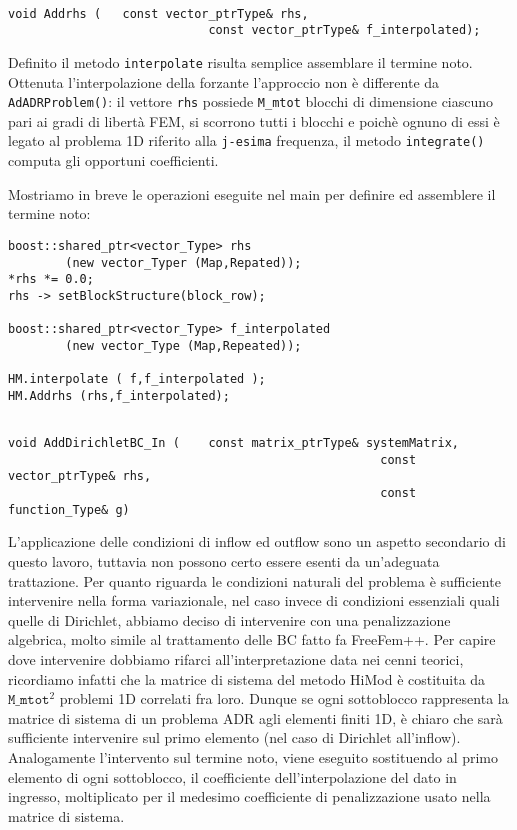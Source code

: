 \begin{lstlisting}[style=general, frame = top]

void Addrhs	(	const vector_ptrType& rhs,
							const vector_ptrType& f_interpolated);
\end{lstlisting}
Definito il metodo \texttt{interpolate} risulta semplice assemblare il termine noto. Ottenuta l'interpolazione della forzante l'approccio non \`e differente da \texttt{AdADRProblem()}: il vettore \texttt{rhs} possiede \texttt{M\_mtot} blocchi di dimensione ciascuno pari ai gradi di libert\`a FEM, si scorrono tutti i blocchi e poich\`e ognuno di essi \`e legato al problema 1D riferito alla \texttt{j-esima} frequenza, il metodo \texttt{integrate()} computa gli opportuni coefficienti.

Mostriamo in breve le operazioni eseguite nel main per definire ed assemblere il termine noto:
\begin{lstlisting}[style = general]
boost::shared_ptr<vector_Type> rhs 
		(new vector_Typer (Map,Repated));
*rhs *= 0.0;
rhs -> setBlockStructure(block_row);

boost::shared_ptr<vector_Type> f_interpolated 
		(new vector_Type (Map,Repeated));

HM.interpolate ( f,f_interpolated );
HM.Addrhs (rhs,f_interpolated);
\end{lstlisting}

\begin{lstlisting}[style = general,frame = top]

void AddDirichletBC_In (	const matrix_ptrType& systemMatrix,
													const vector_ptrType& rhs,
													const function_Type& g)
\end{lstlisting}

L'applicazione delle condizioni di inflow ed outflow sono un aspetto secondario di questo lavoro, tuttavia non possono certo essere esenti da un'adeguata trattazione. Per quanto riguarda le condizioni naturali del problema \`e sufficiente intervenire nella forma variazionale, nel caso invece di condizioni essenziali quali quelle di Dirichlet, abbiamo deciso di intervenire con una penalizzazione algebrica, molto simile al trattamento delle BC fatto fa FreeFem++. Per capire dove intervenire dobbiamo rifarci all'interpretazione data nei cenni teorici, ricordiamo infatti che la matrice di sistema del metodo HiMod \`e costituita da $\texttt{M\_mtot}^2$ problemi 1D correlati fra loro. Dunque se ogni sottoblocco rappresenta la matrice di sistema di un problema ADR agli elementi finiti 1D, \`e chiaro che sar\`a sufficiente intervenire sul primo elemento (nel caso di Dirichlet all'inflow). Analogamente l'intervento sul termine noto, viene eseguito sostituendo al primo elemento di ogni sottoblocco, il coefficiente dell'interpolazione del dato in ingresso, moltiplicato per il medesimo coefficiente di penalizzazione usato nella matrice di sistema.

